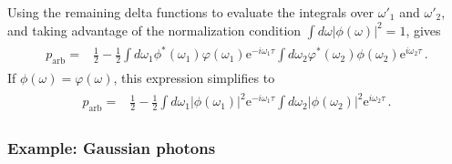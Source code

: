 \documentclass[12pt]{article}
\newcommand{\ee}[1] {\mathrm{e}^{#1}}
\begin{document}
Using the  remaining delta functions to evaluate the integrals over $\omega'_1$ and $\omega'_2$, and taking advantage of the  normalization condition $\int d\omega|\phi(\omega)|^2=1$, gives
\begin{align}\label{eq:someth}
\begin{split}
p_{\mathrm{arb}}={}&\frac{1}{2}-\frac{1}{2}\int d\omega_{1}\phi^*(\omega_{1})\varphi(\omega_{1}) \ee{-i\omega_{1} \tau}\int d\omega_{2}\varphi^*(\omega_{2}) \phi(\omega_{2}) \ee{i\omega_2 \tau}\,.
\end{split}
\end{align}
If $\phi(\omega)=\varphi(\omega)$, this expression simplifies to 
\begin{align}\label{eq:someg}
\begin{split}
p_{\mathrm{arb}}={}&\frac{1}{2}-\frac{1}{2}\int d\omega_{1}|\phi(\omega_{1})|^2\ee{-i\omega_{1} \tau} \int d\omega_{2} |\phi(\omega_{2})|^2\ee{i\omega_2 \tau}\,.
\end{split}
\end{align}

\subsubsection{Example: Gaussian photons}
\end{document}
